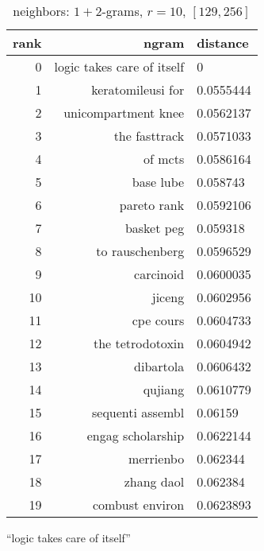 \begin{table}[ht]
\begin{subtable}[t]{.45\textwidth}
        \centering
        \begin{tabularx}{\textwidth}{r R l}
            \toprule
            rank & ngram & distance\\
            \midrule
            \num{0} & logic takes care of itself & \num{0}\\
            \num{1} & keratomileusi for & \num{0.0555444}\\
            \num{2} & unicompartment knee & \num{0.0562137}\\
            \num{3} & the fasttrack & \num{0.0571033}\\
            \num{4} & of mcts & \num{0.0586164}\\
            \num{5} & base lube & \num{0.058743}\\
            \num{6} & pareto rank & \num{0.0592106}\\
            \num{7} & basket peg & \num{0.059318}\\
            \num{8} & to rauschenberg & \num{0.0596529}\\
            \num{9} & carcinoid & \num{0.0600035}\\
            \num{10} & jiceng & \num{0.0602956}\\
            \num{11} & cpe cours & \num{0.0604733}\\
            \num{12} & the tetrodotoxin & \num{0.0604942}\\
            \midrule
            \num{13} & dibartola & \num{0.0606432}\\
            \num{14} & qujiang & \num{0.0610779}\\
            \num{15} & sequenti assembl & \num{0.06159}\\
            \num{16} & engag scholarship & \num{0.0622144}\\
            \num{17} & merrienbo & \num{0.062344}\\
            \num{18} & zhang daol & \num{0.062384}\\
            \num{19} & combust environ & \num{0.0623893}\\
            \bottomrule
        \end{tabularx}
        \caption{\enquote{logic takes care of itself}}
        \label{tab:ranking_chance_2}
    \end{subtable}
    \caption{neighbors: $1+2$-grams, $r = 10$, $[129,256]$}
    \label{tab:ranking_chance}
\end{table}

